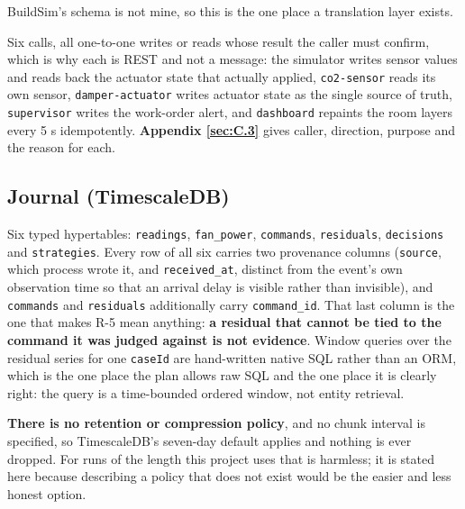BuildSim's schema is not mine, so this is the one place a translation layer exists.

Six calls, all one-to-one writes or reads whose result the caller must confirm, which is why each
is REST and not a message: the simulator writes sensor values and reads back the actuator state
that actually applied, \texttt{co2-sensor} reads its own sensor, \texttt{damper-actuator} writes
actuator state as the single source of truth, \texttt{supervisor} writes the work-order alert, and
\texttt{dashboard} repaints the room layers every 5 s idempotently. \textbf{Appendix \ref{sec:C.3}} gives
caller, direction, purpose and the reason for each.

\subsection{Journal (TimescaleDB)}\label{sec:5.3}

Six typed hypertables: \texttt{readings}, \texttt{fan\_power}, \texttt{commands},
\texttt{residuals}, \texttt{decisions} and \texttt{strategies}. Every row of all six carries two
provenance columns (\texttt{source}, which process wrote it, and \texttt{received\_at}, distinct
from the event's own observation time so that an arrival delay is visible rather than invisible),
and \texttt{commands} and \texttt{residuals} additionally carry \texttt{command\_id}. That last
column is the one that makes R-5 mean anything: \textbf{a residual that cannot be tied to the
command it was judged against is not evidence}. Window queries over the residual series for one
\texttt{caseId} are hand-written native SQL rather than an ORM, which is the one place the plan
allows raw SQL and the one place it is clearly right: the query is a time-bounded ordered window,
not entity retrieval.

\textbf{There is no retention or compression policy}, and no chunk interval is specified, so
TimescaleDB's seven-day default applies and nothing is ever dropped. For runs of the length this
project uses that is harmless; it is stated here because describing a policy that does not exist
would be the easier and less honest option.
